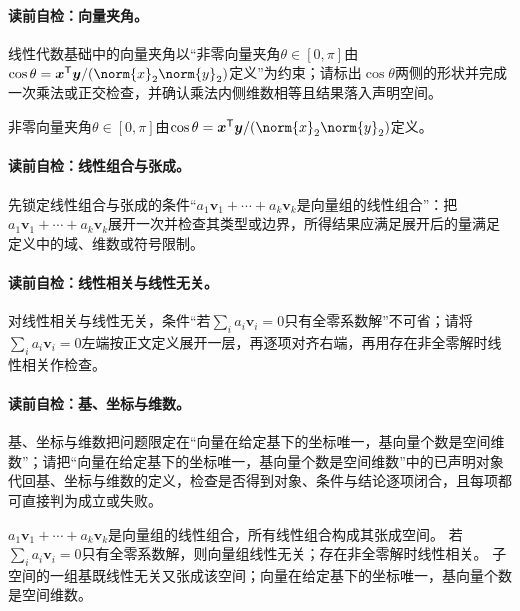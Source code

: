 \paragraph{读前自检：向量夹角。}线性代数基础中的向量夹角以“非零向量夹角$\theta\in[0,\pi]$由$\cos\theta=\boldsymbol{x}^{\mathsf T}\boldsymbol{y}/(\norm{x}_2\norm{y}_2)$定义”为约束；请标出$\cos\theta$两侧的形状并完成一次乘法或正交检查，并确认乘法内侧维数相等且结果落入声明空间。\par

非零向量夹角$\theta\in[0,\pi]$由$\cos\theta=\boldsymbol{x}^{\mathsf T}\boldsymbol{y}/(\norm{x}_2\norm{y}_2)$定义。


\paragraph{读前自检：线性组合与张成。}先锁定线性组合与张成的条件“$a_1\boldsymbol{v}_1+\cdots+a_k\boldsymbol{v}_k$是向量组的线性组合”：把$a_1\boldsymbol{v}_1+\cdots+a_k\boldsymbol{v}_k$展开一次并检查其类型或边界，所得结果应满足展开后的量满足定义中的域、维数或符号限制。\par
\paragraph{读前自检：线性相关与线性无关。}对线性相关与线性无关，条件“若$\sum_i a_i\boldsymbol{v}_i=0$只有全零系数解”不可省；请将$\sum_i a_i\boldsymbol{v}_i=0$左端按正文定义展开一层，再逐项对齐右端，再用存在非全零解时线性相关作检查。\par
\paragraph{读前自检：基、坐标与维数。}基、坐标与维数把问题限定在“向量在给定基下的坐标唯一，基向量个数是空间维数”；请把“向量在给定基下的坐标唯一，基向量个数是空间维数”中的已声明对象代回基、坐标与维数的定义，检查是否得到对象、条件与结论逐项闭合，且每项都可直接判为成立或失败。\par

$a_1\boldsymbol{v}_1+\cdots+a_k\boldsymbol{v}_k$是向量组的线性组合，所有线性组合构成其张成空间。
若$\sum_i a_i\boldsymbol{v}_i=0$只有全零系数解，则向量组线性无关；存在非全零解时线性相关。
子空间的一组基既线性无关又张成该空间；向量在给定基下的坐标唯一，基向量个数是空间维数。


